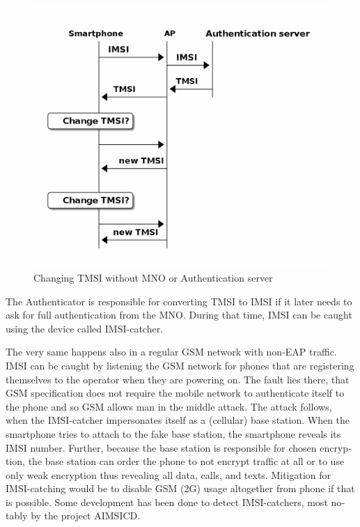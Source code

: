 \documentclass[12pt,a4paper,english]{tutthesis}
\begin{document}
\begin{otherlanguage}{english}
\begin{figure}[htb]
\centering
\includegraphics[width=.9\linewidth]{imsi-tmsi.png}
\caption{\label{fig:tmsi}Changing TMSI without MNO or Authentication server}
\end{figure}




The Authenticator 
is responsible for converting  TMSI to IMSI if it later needs to 
ask for full authentication from the MNO. During that time,
IMSI can be caught using the device called IMSI-catcher.

The very same happens also in a regular GSM network with non-EAP traffic.
IMSI can be caught by listening the GSM network for phones that are
registering themselves to the operator when they are powering on.
The fault lies there, that GSM specification does not require the
mobile network to authenticate itself to the phone and so GSM allows
man in the middle attack. 
The attack follows, when the IMSI-catcher impersonates itself as a
(cellular) base station.  When the smartphone tries to attach to the fake base
station, the smartphone reveals its IMSI number. Further, because the
base station is responsible for chosen encryption, the base station
can order the phone to not encrypt traffic at all or to use only weak
encryption thus revealing all data, calls, and texts. Mitigation for
IMSI-catching would be to disable GSM (2G) usage altogether from phone
if that is possible\cite{imsi-heise}. Some development has been done to detect 
IMSI-catchers, most notably by the project AIMSICD\cite{aimcid}.



\end{otherlanguage}
\end{document}
